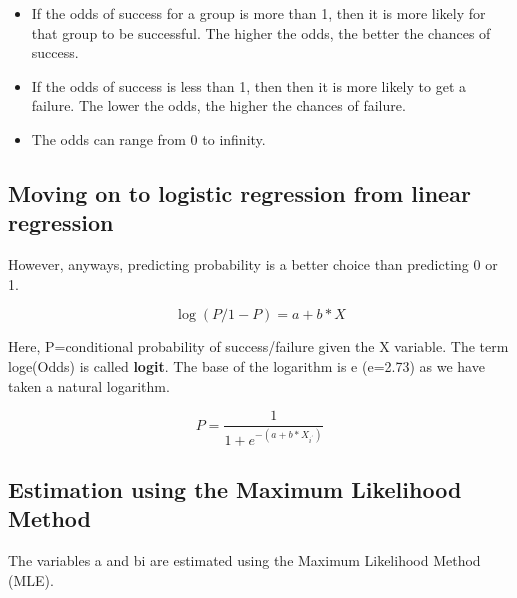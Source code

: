 \documentclass{article}
\numberwithin{equation}{section} %
\begin{document}
\begin{itemize}
	\item If the odds of success for a group is more than 1, then it is more likely for that group to be successful. The higher the odds, the better the chances of success.
	\item If the odds of success is less than 1, then then it is more likely to get a failure. The lower the odds, the higher the chances of failure.
	\item The odds can range from 0 to infinity.
\end{itemize}


\subsection*{Moving on to logistic regression from linear regression}

However, anyways, predicting probability is a better choice than predicting 0 or 1.

\begin{equation*}
\log( P /1 - P) = a + b \ast X
\end{equation*}

Here, P=conditional probability of success/failure given the X variable. The term loge(Odds) is called \textbf{logit}. The base of the logarithm is e (e=2.73) as we have taken a natural logarithm.

\begin{equation*}
P = \frac{1}{1+e^{-(a+b\ast X_{i^\prime})}}
\end{equation*}


\subsection*{Estimation using the Maximum Likelihood Method}

The variables a and bi are estimated using the Maximum Likelihood Method (MLE).
\end{document}
